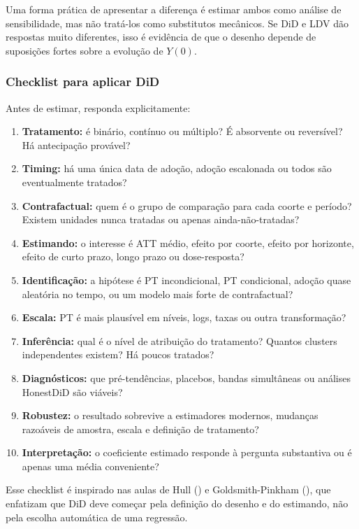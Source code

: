 \documentclass[
]{article}
\providecommand{\tightlist}{%
  \setlength{\itemsep}{0pt}\setlength{\parskip}{0pt}}
\begin{document}
Uma forma prática de apresentar a diferença é estimar ambos como análise de sensibilidade, mas não tratá-los como substitutos mecânicos. Se DiD e LDV dão respostas muito diferentes, isso é evidência de que o desenho depende de suposições fortes sobre a evolução de \(Y(0)\).

\subsubsection{Checklist para aplicar DiD}\label{checklist-para-aplicar-did}

Antes de estimar, responda explicitamente:

\begin{enumerate}
\def\labelenumi{\arabic{enumi}.}
\tightlist
\item
  \textbf{Tratamento:} é binário, contínuo ou múltiplo? É absorvente ou reversível? Há antecipação provável?
\item
  \textbf{Timing:} há uma única data de adoção, adoção escalonada ou todos são eventualmente tratados?
\item
  \textbf{Contrafactual:} quem é o grupo de comparação para cada coorte e período? Existem unidades nunca tratadas ou apenas ainda-não-tratadas?
\item
  \textbf{Estimando:} o interesse é ATT médio, efeito por coorte, efeito por horizonte, efeito de curto prazo, longo prazo ou dose-resposta?
\item
  \textbf{Identificação:} a hipótese é PT incondicional, PT condicional, adoção quase aleatória no tempo, ou um modelo mais forte de contrafactual?
\item
  \textbf{Escala:} PT é mais plausível em níveis, logs, taxas ou outra transformação?
\item
  \textbf{Inferência:} qual é o nível de atribuição do tratamento? Quantos clusters independentes existem? Há poucos tratados?
\item
  \textbf{Diagnósticos:} que pré-tendências, placebos, bandas simultâneas ou análises HonestDiD são viáveis?
\item
  \textbf{Robustez:} o resultado sobrevive a estimadores modernos, mudanças razoáveis de amostra, escala e definição de tratamento?
\item
  \textbf{Interpretação:} o coeficiente estimado responde à pergunta substantiva ou é apenas uma média conveniente?
\end{enumerate}

Esse checklist é inspirado nas aulas de Hull () e Goldsmith-Pinkham (), que enfatizam que DiD deve começar pela definição do desenho e do estimando, não pela escolha automática de uma regressão.
\end{document}
